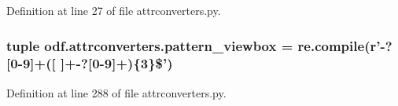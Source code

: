 Definition at line 27 of file attrconverters.\+py.

\hypertarget{namespaceodf_1_1attrconverters_a3df24b76956ae1cb73bf3fd649d558a3}{
\subsubsection[{pattern\+\_\+viewbox}]{\setlength{\rightskip}{0pt plus 5cm}tuple odf.\+attrconverters.\+pattern\+\_\+viewbox = re.\+compile(r'-\/?\mbox{[}0-\/9\mbox{]}+(\mbox{[} \mbox{]}+-\/?\mbox{[}0-\/9\mbox{]}+)\{3\}\$')}}\label{namespaceodf_1_1attrconverters_a3df24b76956ae1cb73bf3fd649d558a3}


Definition at line 288 of file attrconverters.\+py.

